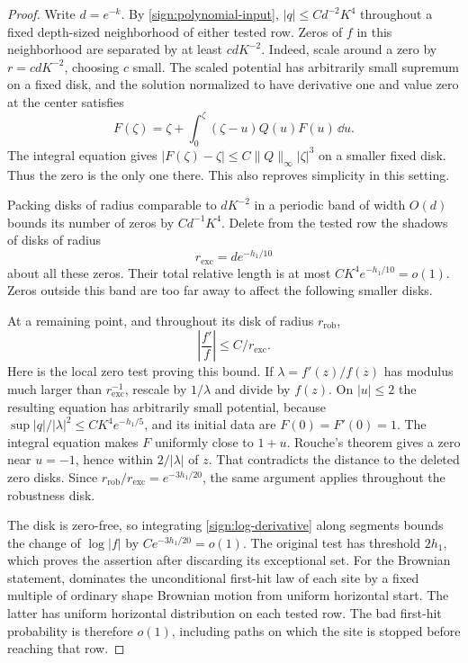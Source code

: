 \begin{proof}
Write \(d=e^{-k}\).  By \eqref{sign:polynomial-input},
\(|q|\le C d^{-2}K^4\) throughout a fixed depth-sized neighborhood
of either tested row.  Zeros of \(f\) in this neighborhood are
separated by at least \(c dK^{-2}\).  Indeed, scale around a zero
by \(r=c dK^{-2}\), choosing \(c\) small.  The scaled potential
has arbitrarily small supremum on a fixed disk, and the solution
normalized to have derivative one and value zero at the center
satisfies
\[
 F(\zeta)=\zeta+
       \int_0^\zeta(\zeta-u)Q(u)F(u)\,\dd u.
\]
The integral equation gives \(|F(\zeta)-\zeta|\le C\|Q\|_\infty
|\zeta|^3\) on a smaller fixed disk.  Thus the zero is the only
one there.  This also reproves simplicity in this setting.

Packing disks of radius comparable to \(dK^{-2}\) in a periodic
band of width \(O(d)\) bounds its number of zeros by
\(C d^{-1}K^4\).  Delete from the tested row the shadows of disks
of radius
\[
 r_{\mathrm{exc}}=d e^{-h_1/10}
\]
about all these zeros.  Their total relative length is at most
\(CK^4e^{-h_1/10}=o(1)\).  Zeros outside this band are too far away
to affect the following smaller disks.

At a remaining point, and throughout its disk of radius
\(r_{\mathrm{rob}}\),
\begin{equation}\label{sign:log-derivative}
 \left|\frac{f'}f\right|\le C/r_{\mathrm{exc}}.
\end{equation}
Here is the local zero test proving this bound.  If
\(\lambda=f'(z)/f(z)\) has modulus much larger than
\(r_{\mathrm{exc}}^{-1}\), rescale by \(1/\lambda\) and divide by
\(f(z)\).  On \(|u|\le2\) the resulting equation has arbitrarily
small potential, because
\(\sup|q|/|\lambda|^2\le CK^4e^{-h_1/5}\), and its initial data
are \(F(0)=F'(0)=1\).  The integral equation makes \(F\) uniformly
close to \(1+u\).  Rouche's theorem gives a zero near \(u=-1\),
hence within \(2/|\lambda|\) of \(z\).  That contradicts the
distance to the deleted zero disks.  Since
\(r_{\mathrm{rob}}/r_{\mathrm{exc}}=e^{-3h_1/20}\), the same
argument applies throughout the robustness disk.

The disk is zero-free, so integrating \eqref{sign:log-derivative}
along segments bounds the change of \(\log|f|\) by
\(Ce^{-3h_1/20}=o(1)\).  The original test has threshold \(2h_1\),
which proves the assertion after discarding its exceptional set.
For the Brownian statement,  dominates the
unconditional first-hit law of each site by a fixed multiple of
ordinary shape Brownian motion from uniform horizontal start.
The latter has uniform horizontal distribution on each tested row.
The bad first-hit probability is therefore \(o(1)\), including
paths on which the site is stopped before reaching that row.
\end{proof}
